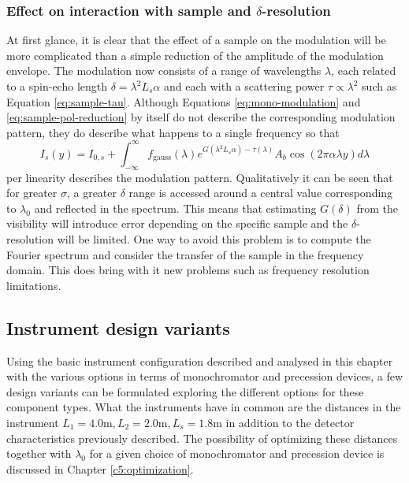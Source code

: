 \documentclass{article}
\begin{document}
\subsubsection{Effect on interaction with sample and $\delta$-resolution}
At first glance, it is clear that the effect of a sample on the modulation will be more complicated than a simple reduction of the amplitude of the modulation envelope. The modulation now consists of a range of wavelengths $\lambda$, each related to a spin-echo length $\delta = \lambda^2 L_s\alpha$ and each with a scattering power $\tau \propto\lambda^2$ such as Equation \eqref{eq:sample-tau}. Although Equations \eqref{eq:mono-modulation} and \eqref{eq:sample-pol-reduction} by itself do not describe the corresponding modulation pattern, they do describe what happens to a single frequency so that
\begin{equation}
	I_s(y) = I_{0,s} + \int_{-\infty}^\infty f_{\text{gauss}}(\lambda)e^{G(\lambda^2 L_s\alpha) - \tau(\lambda)}A_b\cos(2\pi\alpha\lambda y)d\lambda \label{eq:poly-sample-modulation}
\end{equation}
per linearity describes the modulation pattern. Qualitatively it can be seen that for greater $\sigma$, a greater $\delta$ range is accessed around a central value corresponding to $\lambda_0$ and reflected in the spectrum. This means that estimating $G(\delta)$ from the visibility will introduce error depending on the specific sample and the $\delta$-resolution will be limited. One way to avoid this problem is to compute the Fourier spectrum and consider the transfer of the sample in the frequency domain. This does bring with it new problems such as frequency resolution limitations. 


\subsection{Instrument design variants}
\label{c3.6}
Using the basic instrument configuration described and analysed in this chapter with the various options in terms of monochromator and precession devices, a few design variants can be formulated exploring the different options for these component types. What the instruments have in common are the distances in the instrument $L_1 = 4.0\unit{\meter}, L_2 = 2.0\unit{\meter}, L_s = 1.8\unit{\meter}$ in addition to the detector characteristics previously described. The possibility of optimizing these distances together with $\lambda_0$ for a given choice of monochromator and precession device is discussed in Chapter \ref{c5:optimization}.  
\end{document}
